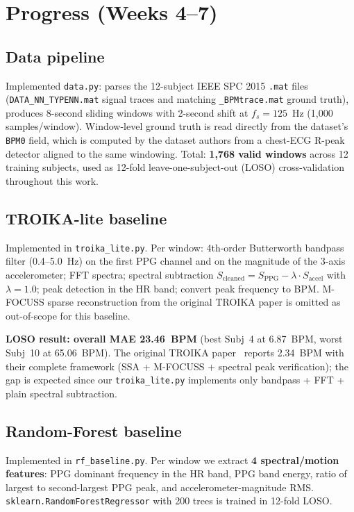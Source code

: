 \documentclass[sigconf,nonacm,balance]{acmart}
\begin{document}
\section{Progress (Weeks 4--7)}

\subsection{Data pipeline}
Implemented \texttt{data.py}: parses the 12-subject IEEE SPC 2015 \texttt{.mat} files (\texttt{DATA\_NN\_TYPENN.mat} signal traces and matching \texttt{\_BPMtrace.mat} ground truth), produces 8-second sliding windows with 2-second shift at $f_s{=}125$~Hz (1{,}000 samples/window). Window-level ground truth is read directly from the dataset's \texttt{BPM0} field, which is computed by the dataset authors from a chest-ECG R-peak detector aligned to the same windowing. Total: \textbf{1{,}768 valid windows} across 12 training subjects, used as 12-fold leave-one-subject-out (LOSO) cross-validation throughout this work.

\subsection{TROIKA-lite baseline}
Implemented in \texttt{troika\_lite.py}. Per window: 4th-order Butterworth bandpass filter (0.4--5.0~Hz) on the first PPG channel and on the magnitude of the 3-axis accelerometer; FFT spectra; spectral subtraction $S_{\mathrm{cleaned}} = S_{\mathrm{PPG}} - \lambda \cdot S_{\mathrm{accel}}$ with $\lambda{=}1.0$; peak detection in the HR band; convert peak frequency to BPM. M-FOCUSS sparse reconstruction from the original TROIKA paper is omitted as out-of-scope for this baseline.

\textbf{LOSO result: overall MAE 23.46~BPM} (best Subj~4 at 6.87~BPM, worst Subj~10 at 65.06~BPM). The original TROIKA paper~\cite{zhang2015troika} reports 2.34~BPM with their complete framework (SSA + M-FOCUSS + spectral peak verification); the gap is expected since our \texttt{troika\_lite.py} implements only bandpass + FFT + plain spectral subtraction.

\subsection{Random-Forest baseline}
Implemented in \texttt{rf\_baseline.py}. Per window we extract \textbf{4 spectral/motion features}: PPG dominant frequency in the HR band, PPG band energy, ratio of largest to second-largest PPG peak, and accelerometer-magnitude RMS. \texttt{sklearn.RandomForestRegressor} with 200 trees is trained in 12-fold LOSO.
\end{document}
